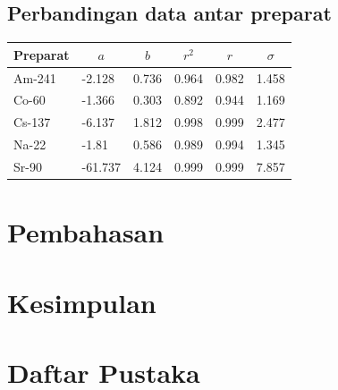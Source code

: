 \documentclass{article}
\begin{document}
			\subsection*{Perbandingan data antar preparat}
				\begin{longtable}{@{}llllll@{}}
					\toprule
					Preparat &
					\multicolumn{1}{c}{$a$} &
					\multicolumn{1}{c}{$b$} &
					\multicolumn{1}{c}{$r^{2}$} &
					\multicolumn{1}{c}{$r$} &
					\multicolumn{1}{c}{$\sigma$} \\* \midrule
					\endfirsthead
					\endhead
					\bottomrule
					\endfoot
					\endlastfoot
					Am-241 & -2.128  & 0.736 & 0.964 & 0.982 & 1.458 \\
					Co-60  & -1.366  & 0.303 & 0.892 & 0.944 & 1.169 \\
					Cs-137 & -6.137  & 1.812 & 0.998 & 0.999 & 2.477 \\
					Na-22  & -1.81   & 0.586 & 0.989 & 0.994 & 1.345 \\
					Sr-90  & -61.737 & 4.124 & 0.999 & 0.999 & 7.857 \\* \bottomrule
				\end{longtable}
			
	
	\section*{Pembahasan}
	
	\section*{Kesimpulan}
	
	\section*{Daftar Pustaka}
	
	
\end{document}
